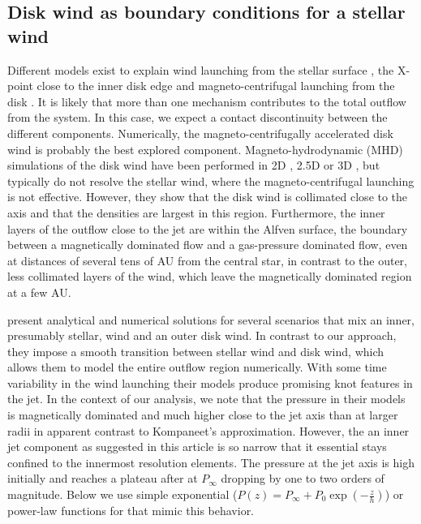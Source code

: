 \subsection{Disk wind as boundary conditions for a stellar wind}
Different models exist to explain wind launching from the stellar surface \citep{1988ApJ...332L..41K,2005ApJ...632L.135M}, the X-point close to the inner disk edge \citep{1994ApJ...429..781S} and magneto-centrifugal launching from the disk \citep{1982MNRAS.199..883B,2005ApJ...630..945A}. It is likely that more than one mechanism contributes to the total outflow from the system. In this case, we expect a contact discontinuity between the different components. Numerically, the magneto-centrifugally accelerated disk wind is probably the best explored component. Magneto-hydrodynamic (MHD) simulations of the disk wind have been performed in 2D \citep{2005ApJ...630..945A}, 2.5D \citep{2011ApJ...728L..11R} or 3D \citep{2006ApJ...653L..33A}, but typically do not resolve the stellar wind, where the magneto-centrifugal launching is not effective. However, they show that the disk wind is collimated close to the axis and that the densities are largest in this region. Furthermore, the inner layers of the outflow close to the jet are within the Alfven surface, the boundary between a magnetically dominated flow and a gas-pressure dominated flow, even at distances of several tens of AU from the central star, in contrast to the outer, less collimated layers of the wind, which leave the magnetically dominated region at a few AU.

\citet{2009A&amp;A...502..217M} present analytical and numerical solutions for several scenarios that mix an inner, presumably stellar, wind and an outer disk wind. In contrast to our approach, they impose a smooth transition between stellar wind and disk wind, which allows them to model the entire outflow region numerically. With some time variability in the wind launching their models produce promising knot features in the jet. In the context of our analysis, we note that the pressure in their models is magnetically dominated and much higher close to the jet axis than at larger radii in apparent contrast to Kompaneet's approximation. However, the an inner jet component as suggested in this article is so narrow that it essential stays confined to the innermost resolution elements. The pressure at the jet axis is high initially and reaches a plateau after at $P_\infty$ dropping by one to two orders of magnitude. Below we use simple exponential ($P(z)=P_\infty+P_0\exp\left(-\frac{z}{h}\right)$) or power-law functions for that mimic this behavior.

